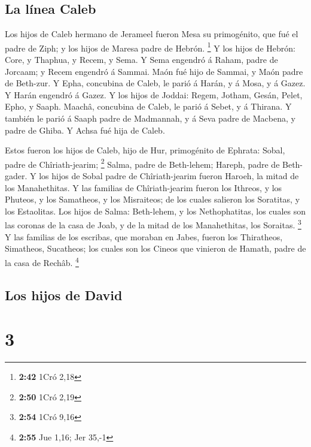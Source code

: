 \hypertarget{la-luxednea-caleb-1}{%
\subsection{La línea Caleb}\label{la-luxednea-caleb-1}}

 Los hijos de Caleb hermano de Jerameel fueron Mesa su
primogénito, que fué el padre de Ziph; y los hijos de Maresa padre de
Hebrón. \footnote{\textbf{2:42} 1Cró 2,18}  Y los hijos de
Hebrón: Core, y Thaphua, y Recem, y Sema.  Y Sema engendró
á Raham, padre de Jorcaam; y Recem engendró á Sammai.  Maón
fué hijo de Sammai, y Maón padre de Beth-zur.  Y Epha,
concubina de Caleb, le parió á Harán, y á Mosa, y á Gazez. Y Harán
engendró á Gazez.  Y los hijos de Joddai: Regem, Jotham,
Gesán, Pelet, Epho, y Saaph.  Maachâ, concubina de Caleb,
le parió á Sebet, y á Thirana.  Y también le parió á Saaph
padre de Madmannah, y á Seva padre de Macbena, y padre de Ghiba. Y Achsa
fué hija de Caleb.

 Estos fueron los hijos de Caleb, hijo de Hur, primogénito
de Ephrata: Sobal, padre de Chîriath-jearim; \footnote{\textbf{2:50}
  1Cró 2,19}  Salma, padre de Beth-lehem; Hareph, padre de
Beth-gader.  Y los hijos de Sobal padre de Chîriath-jearim
fueron Haroeh, la mitad de los Manahethitas.  Y las
familias de Chîriath-jearim fueron los Ithreos, y los Phuteos, y los
Samatheos, y los Misraiteos; de los cuales salieron los Soratitas, y los
Estaolitas.  Los hijos de Salma: Beth-lehem, y los
Nethophatitas, los cuales son las coronas de la casa de Joab, y de la
mitad de los Manahethitas, los Soraitas. \footnote{\textbf{2:54} 1Cró
  9,16}  Y las familias de los escribas, que moraban en
Jabes, fueron los Thiratheos, Simatheos, Sucatheos; los cuales son los
Cineos que vinieron de Hamath, padre de la casa de Rechâb. \footnote{\textbf{2:55}
  Jue 1,16; Jer 35,-1}

\hypertarget{los-hijos-de-david}{%
\subsection{Los hijos de David}\label{los-hijos-de-david}}

\hypertarget{section-2}{%
\section{3}\label{section-2}}

